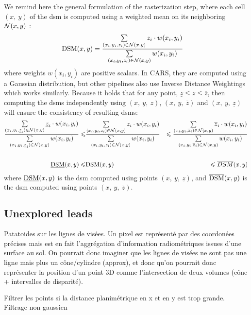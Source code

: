 We remind here the general formulation of the rasterization step, where each cell $(x,~y)$ of the \acrshort{dsm} is computed using a weighted mean on its neighboring $\mathcal{N}(x,y)$ :
\begin{align}
    \mathrm{DSM}(x,y) &= \dfrac{\sum\limits_{(x_i, y_i, z_i)\in\mathcal{N}(x,y)}z_i\cdot w(x_i, y_i)}{\sum\limits_{(x_i,y_i,z_i)\in\mathcal{N}(x,y)} w(x_i, y_i)}
\end{align}
where weights $w(x_i,y_i)$ are positive scalars. In CARS, they are computed using a Gaussian distribution, but other pipelines also use Inverse Distance Weightings which works similarly. Because it holds that for any point, $\underline{z}\leqslant z\leqslant\overline{z}$, then computing the \acrshort{dsm}s independently using $(x, ~y, ~z)$, $(x, ~y, ~\overline{z})$ and $(x, ~y, ~\underline{z})$ will ensure the consistency of resulting \acrshort{dsm}s:
\begin{eqnarray}
    \dfrac{\sum\limits_{(x_i, y_i, \underline{z}_i)\in\mathcal{N}(x,y)}\underline{z}_i\cdot w(x_i, y_i)}{\sum\limits_{(x_i,y_i, \underline{z}_i)\in\mathcal{N}(x,y)} w(x_i, y_i)}
    \leqslant&
    \dfrac{\sum\limits_{(x_i, y_i, z_i)\in\mathcal{N}(x,y)}z_i\cdot w(x_i, y_i)}{\sum\limits_{(x_i,y_i,z_i)\in\mathcal{N}(x,y)} w(x_i, y_i)}
    &\leqslant
    \dfrac{\sum\limits_{(x_i, y_i, \overline{z}_i)\in\mathcal{N}(x,y)}\overline{z}_i\cdot w(x_i, y_i)}{\sum\limits_{(x_i,y_i,\overline{z}_i)\in\mathcal{N}(x,y)} w(x_i, y_i)}\nonumber\\
    &&\nonumber\\
    \underline{\mathrm{DSM}}(x,y) \leqslant& \mathrm{DSM}(x,y) &\leqslant\overline{DSM}(x,y)
\end{eqnarray}
where $\underline{\mathrm{DSM}}(x,y)$ is the \acrshort{dsm} computed using points $(x, ~y, ~\underline{z})$, and $\overline{\mathrm{DSM}}(x,y)$ is the \acrshort{dsm} computed using points $(x, ~y, ~\overline{z})$.

\subsection{Unexplored leads}
Patatoides sur les lignes de visées. Un pixel est représenté par des coordonées précises mais est en fait l'aggrégation d'information radiométriques issues d'une surface au sol. On pourrait donc imaginer que les lignes de visées ne sont pas une ligne mais plus un cône/cylindre (approx), et donc qu'on pourrait donc représenter la position d'un point 3D comme l'intersection de deux volumes (cône + intervalles de disparité).   

Filtrer les points si la distance planimétrique en x et en y est trop grande. 
Filtrage non gaussien 


